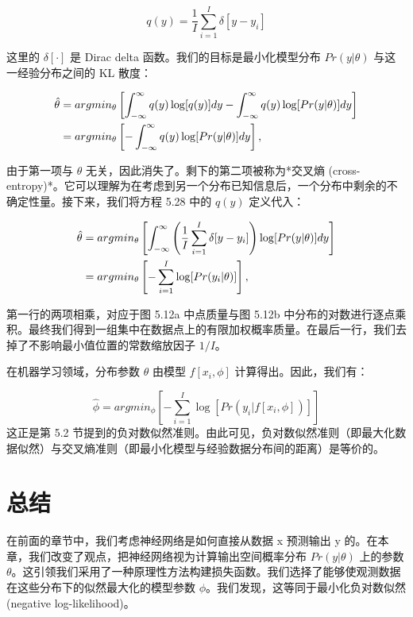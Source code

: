 \documentclass[lang=cn,newtx,10pt,scheme=chinese]{elegantbook}
\begin{document}
\begin{equation}
q(y) = \frac{1}{I} \sum_{i=1}^{I} \delta[y - y_i] 
\end{equation}

这里的 \(\delta[\cdot]\) 是 Dirac delta 函数。我们的目标是最小化模型分布 \(Pr(y|\theta)\) 与这一经验分布之间的 KL 散度：


\begin{align}
	\hat{\theta} &= argmin_{\theta} \left[ \int_{-\infty}^{\infty} q(y) \log [q(y)] dy - \int_{-\infty}^{\infty} q(y) \log [Pr(y|\theta)] dy \right] \notag \\
	&= argmin_{\theta} \left[ -\int_{-\infty}^{\infty} q(y) \log [Pr(y|\theta)] dy \right], 
\end{align}


由于第一项与 \(\theta\) 无关，因此消失了。剩下的第二项被称为*交叉熵 (cross-entropy)*。它可以理解为在考虑到另一个分布已知信息后，一个分布中剩余的不确定性量。接下来，我们将方程 5.28 中的 \(q(y)\) 定义代入：


\begin{align}
	\hat{\theta} &= argmin_{\theta} \left[ \int_{-\infty}^{\infty} \left( \frac{1}{I} \sum_{i=1}^{I} \delta[y - y_i] \right) \log [Pr(y|\theta)] dy \right] \notag \\
	&= argmin_{\theta} \left[ -\sum_{i=1}^{I} \log [Pr(y_i|\theta)] \right], 
\end{align} 


第一行的两项相乘，对应于图 5.12a 中点质量与图 5.12b 中分布的对数进行逐点乘积。最终我们得到一组集中在数据点上的有限加权概率质量。在最后一行，我们去掉了不影响最小值位置的常数缩放因子 \(1/I\)。

在机器学习领域，分布参数 \(\theta\) 由模型 \(f[x_i, \phi]\) 计算得出。因此，我们有：

\begin{equation}
\hat{\phi} = argmin_{\phi} \left[ -\sum_{i=1}^{I} \log [Pr(y_i|f[x_i, \phi])] \right] 
\end{equation}
这正是第 5.2 节提到的负对数似然准则。由此可见，负对数似然准则（即最大化数据似然）与交叉熵准则（即最小化模型与经验数据分布间的距离）是等价的。

\section{总结}

在前面的章节中，我们考虑神经网络是如何直接从数据 x 预测输出 y 的。在本章，我们改变了观点，把神经网络视为计算输出空间概率分布 \(Pr(y|\theta)\) 上的参数 \(\theta\)。这引领我们采用了一种原理性方法构建损失函数。我们选择了能够使观测数据在这些分布下的似然最大化的模型参数 \(\phi\)。我们发现，这等同于最小化负对数似然 (negative log-likelihood)。
\end{document}
